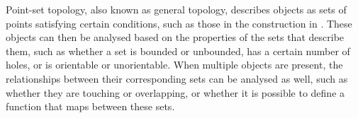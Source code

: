 Point-set topology, also known as general topology, describes objects as sets of points satisfying certain conditions, such as those in the construction in .
These objects can then be analysed based on the properties of the sets that describe them, such as whether a set is bounded or unbounded, has a certain number of holes, or is orientable or unorientable.
When multiple objects are present, the relationships between their corresponding sets can be analysed as well, such as whether they are touching or overlapping, or whether it is possible to define a function that maps between these sets.

